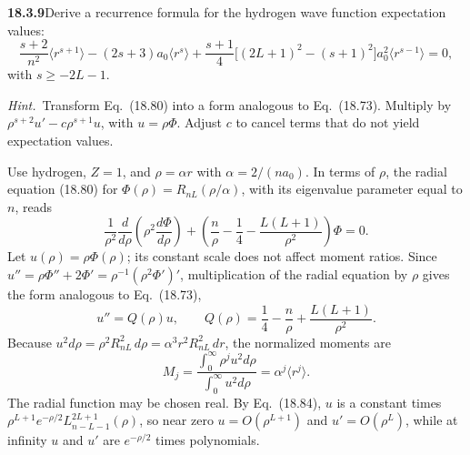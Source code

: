 \par\bigskip
\noindent\textbf{18.3.9}\quad Derive a recurrence formula for the
hydrogen wave function expectation values:
\[
\frac{s+2}{n^{2}}\big\langle r^{s+1}\big\rangle
-(2s+3)a_{0}\big\langle r^{s}\big\rangle
+\frac{s+1}{4}\Big[(2L+1)^{2}-(s+1)^{2}\Big]
a_{0}^{2}\big\langle r^{s-1}\big\rangle=0,
\]
with $s\ge-2L-1$.
\par\emph{Hint.}~Transform Eq.~(18.80) into a form analogous to
Eq.~(18.73). Multiply by $\rho^{s+2}u'-c\rho^{s+1}u$, with
$u=\rho\Phi$. Adjust $c$ to cancel terms that do not yield
expectation values.
\par\nobreak
\solution
Use hydrogen, $Z=1$, and $\rho=\alpha r$ with
$\alpha=2/(na_0)$.  In terms of $\rho$, the radial equation (18.80)
for $\Phi(\rho)=R_{nL}(\rho/\alpha)$, with its eigenvalue parameter
equal to $n$, reads
\[
\frac1{\rho^2}\frac{d}{d\rho}\left(\rho^2\frac{d\Phi}{d\rho}\right)
 +\left(\frac n\rho-\frac14-\frac{L(L+1)}{\rho^2}\right)\Phi=0.
\]
Let $u(\rho)=\rho\Phi(\rho)$; its constant scale does not affect moment
ratios.  Since $u''=\rho\Phi''+2\Phi'=\rho^{-1}(\rho^2\Phi')'$,
multiplication of the radial equation by $\rho$ gives the form
analogous to Eq.~(18.73),
\[
u''=Q(\rho)u,\qquad
Q(\rho)=\frac14-\frac n\rho+\frac{L(L+1)}{\rho^2}.
\]
Because $u^2d\rho=\rho^2R_{nL}^2\,d\rho=\alpha^3r^2R_{nL}^2\,dr$, the
normalized moments are
\[
M_j=\frac{\int_0^\infty\rho^ju^2d\rho}
          {\int_0^\infty u^2d\rho}
    =\alpha^j\langle r^j\rangle.
\]
The radial function may be chosen real.  By Eq.~(18.84), $u$ is a
constant times $\rho^{L+1}e^{-\rho/2}L_{n-L-1}^{2L+1}(\rho)$, so near zero
$u=O(\rho^{L+1})$ and $u'=O(\rho^L)$, while at infinity $u$ and $u'$
are $e^{-\rho/2}$ times polynomials.

